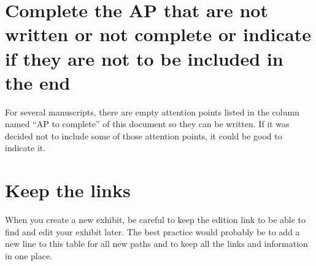 \documentclass{article}
\begin{document}
    \section{Complete the AP that are not written or not complete or indicate if they are not to be included in the end}
    For several manuscripts, there are empty attention points listed in the column named “AP to complete” of this document so they can be written. If it was decided not to include some of those attention points, it could be good to indicate it.

    \section{Keep the links}
    When you create a new exhibit, be careful to keep the edition link to be able to find and edit your exhibit later. The best practice would probably be to add a new line to this table for all new paths and to keep all the links and information in one place. 
\end{document}

